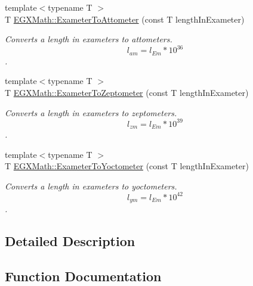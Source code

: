 \begin{DoxyCompactItemize}
{\footnotesize template$<$typename T $>$ }\\T \mbox{\hyperlink{group___e_g_x_math-_conversions-_length_conversions-_s_i-_exameter-_s_i_ga9218bf3c4bf645d50a26dda886a81765}{E\+G\+X\+Math\+::\+Exameter\+To\+Attometer}} (const T length\+In\+Exameter)
\begin{DoxyCompactList}\small\item\em Converts a length in exameters to attometers. \[ l_{am}=l_{Em} * 10^{36} \]. \end{DoxyCompactList}\item 
{\footnotesize template$<$typename T $>$ }\\T \mbox{\hyperlink{group___e_g_x_math-_conversions-_length_conversions-_s_i-_exameter-_s_i_ga5c4c4016d9d88622b4f3c5c071779025}{E\+G\+X\+Math\+::\+Exameter\+To\+Zeptometer}} (const T length\+In\+Exameter)
\begin{DoxyCompactList}\small\item\em Converts a length in exameters to zeptometers. \[ l_{zm}=l_{Em} * 10^{39} \]. \end{DoxyCompactList}\item 
{\footnotesize template$<$typename T $>$ }\\T \mbox{\hyperlink{group___e_g_x_math-_conversions-_length_conversions-_s_i-_exameter-_s_i_ga0da838a3aa4a2f6ee53687aa346f80ef}{E\+G\+X\+Math\+::\+Exameter\+To\+Yoctometer}} (const T length\+In\+Exameter)
\begin{DoxyCompactList}\small\item\em Converts a length in exameters to yoctometers. \[ l_{ym}=l_{Em} * 10^{42} \]. \end{DoxyCompactList}\end{DoxyCompactItemize}


\subsection{Detailed Description}


\subsection{Function Documentation}
\mbox{\label{group___e_g_x_math-_conversions-_length_conversions-_s_i-_exameter-_s_i_ga9218bf3c4bf645d50a26dda886a81765}} 
